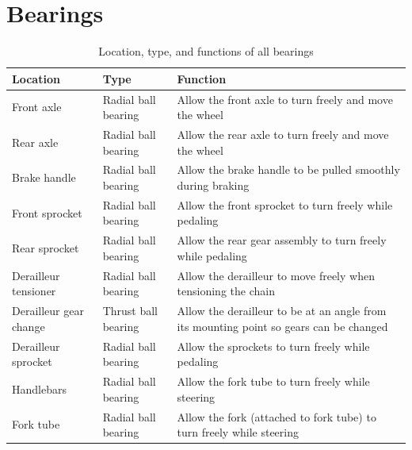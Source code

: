 \documentclass[11pt]{article}
\begin{document}
\section*{Bearings}
\begin{table}[H]
	\centering
	\begin{tabular}{|l|l|p{3.5in}|}
		\hline
		\textbf{Location} & \textbf{Type} & \textbf{Function} \\
		\hline
		Front axle & Radial ball bearing & Allow the front axle to turn freely and move the wheel \\
		\hline
		Rear axle & Radial ball bearing & Allow the rear axle to turn freely and move the wheel \\
		\hline
		Brake handle & Radial ball bearing & Allow the brake handle to be pulled smoothly during braking \\
		\hline
		Front sprocket & Radial ball bearing & Allow the front sprocket to turn freely while pedaling \\
		\hline
		Rear sprocket & Radial ball bearing & Allow the rear gear assembly to turn freely while pedaling \\
		\hline
		Derailleur tensioner & Radial ball bearing & Allow the derailleur to move freely when tensioning the chain \\
		\hline
		Derailleur gear change & Thrust ball bearing & Allow the derailleur to be at an angle from its mounting point so gears can be changed \\
		\hline
		Derailleur sprocket & Radial ball bearing & Allow the sprockets to turn freely while pedaling \\
		\hline
		Handlebars & Radial ball bearing & Allow the fork tube to turn freely while steering \\
		\hline
		Fork tube & Radial ball bearing & Allow the fork (attached to fork tube) to turn freely while steering \\
		\hline
	\end{tabular}
	\caption{Location, type, and functions of all bearings}
\end{table}
\end{document}

